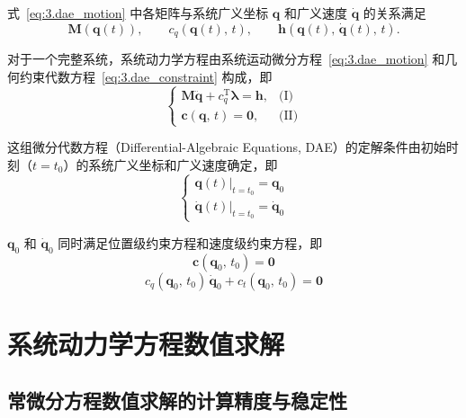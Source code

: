式~\eqref{eq:3.dae_motion} 中各矩阵与系统广义坐标 $\boldsymbol{q}$ 和广义速度 $\dot{\boldsymbol{q}}$ 的关系满足
\begin{equation*}
\boldsymbol{M}(\boldsymbol{q}(t)), \qquad c_q(\boldsymbol{q}(t),\, t), \qquad \boldsymbol{h}(\boldsymbol{q}(t),\, \dot{\boldsymbol{q}}(t),\, t).
\end{equation*}

对于一个完整系统，系统动力学方程由系统运动微分方程~\eqref{eq:3.dae_motion} 和几何约束代数方程~\eqref{eq:3.dae_constraint} 构成，即
\begin{equation}\label{eq:3.dae_system}
\begin{cases}
\boldsymbol{M} \ddot{\boldsymbol{q}} + c_q^{\mathrm{T}} \boldsymbol{\lambda} = \boldsymbol{h}, & \text{(I)} \\[6pt]
\boldsymbol{c}(\boldsymbol{q},\, t) = \boldsymbol{0}, & \text{(II)}
\end{cases}
\end{equation}

这组微分代数方程（Differential-Algebraic Equations, DAE）的定解条件由初始时刻（$t = t_0$）的系统广义坐标和广义速度确定，即
\begin{equation}
\begin{cases}
\boldsymbol{q}(t)\big|_{t=t_0} = \boldsymbol{q}_0 \\[4pt]
\dot{\boldsymbol{q}}(t)\big|_{t=t_0} = \dot{\boldsymbol{q}}_0
\end{cases}
\end{equation}

$\boldsymbol{q}_0$ 和 $\dot{\boldsymbol{q}}_0$ 同时满足位置级约束方程和速度级约束方程，即
\begin{equation}\label{eq:3.init_pos}
\boldsymbol{c}(\boldsymbol{q}_0,\, t_0) = \boldsymbol{0} \tag{III}
\end{equation}
\begin{equation}\label{eq:3.init_vel}
c_q(\boldsymbol{q}_0,\, t_0)\, \dot{\boldsymbol{q}}_0 + c_t(\boldsymbol{q}_0,\, t_0) = \boldsymbol{0} \tag{IV}
\end{equation}


\section{系统动力学方程数值求解}

\subsection{常微分方程数值求解的计算精度与稳定性}

